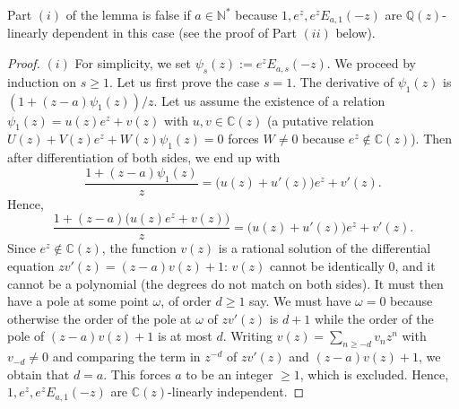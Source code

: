 \documentclass[10pt,a4paper]{amsart}
\begin{document}
\begin{Remark} Part $(i)$ of the lemma is false if $a\in \mathbb N^{*}$ because $1, e^z, e^zE_{a,1}(-z)$ are $\mathbb Q(z)$-linearly dependent in this case (see the proof of Part $(ii)$ below).
\end{Remark}

\begin{proof} $(i)$ For simplicity, we set  $\psi_s(z):=e^zE_{a,s}(-z)$. We proceed by induction on $s\ge 1$. Let us first prove the case $s=1$. The derivative of $\psi_1(z)$ is $(1+(z-a)\psi_1(z))/z$. Let us assume the existence of a relation $\psi_1(z)=u(z)e^z+v(z)$ with $u,v\in \mathbb C(z)$ (a putative relation $U(z)+V(z)e^z+W(z)\psi_1(z)=0$ forces $W\neq 0$ because $e^z\notin \mathbb C(z)$). Then after differentiation of both sides, we end up with 
$$
\frac{1+(z-a)\psi_1(z)}{z}=\big(u(z)+u'(z)\big)e^z+v'(z).
$$
Hence, 
$$
\frac{1+(z-a)\big(u(z)e^z+v(z)\big)}{z}=\big(u(z)+u'(z)\big)e^z+v'(z).
$$
Since $e^z\notin \mathbb C(z)$, the function $v(z)$ is a rational solution of the differential equation $zv'(z)=(z-a)v(z)+1$: $v(z)$ cannot be identically 0, and it cannot be a polynomial (the degrees do not match on both sides). It must then have a pole at some point $\omega$, of order $d\ge 1$ say. We must have $\omega=0$ because otherwise the order of the pole at $\omega$ of $zv'(z)$ is $d+1$ while the order of the pole of $(z-a)v(z)+1$ is at most $d$. Writing $v(z)=\sum_{n\ge -d} v_nz^n$ with $v_{-d}\neq 0$ and comparing the term in $z^{-d}$ of $zv'(z)$ and $(z-a)v(z)+1$, we obtain that $d=a$. This forces $a$ to be an integer $\ge 1$, which is excluded. Hence, $1, e^z, e^zE_{a,1}(-z)$ are $\mathbb C(z)$-linearly independent.
\medskip


\end{proof}
\end{document}
